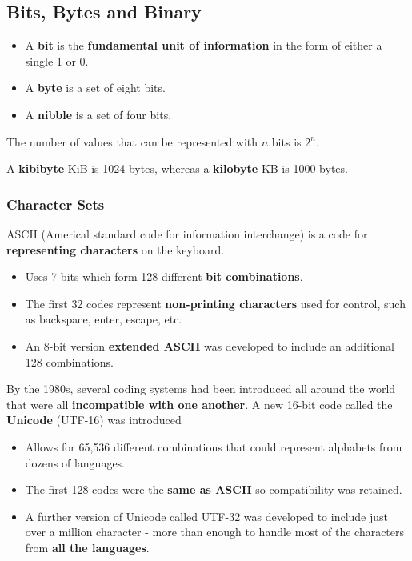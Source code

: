 \subsection{Bits, Bytes and Binary}
\begin{itemize}
    \item A \textbf{bit} is the \textbf{fundamental unit of information} in the form of either a single 1 or 0.
    \item A \textbf{byte} is a set of eight bits.
    \item A \textbf{nibble} is a set of four bits.
\end{itemize}

The number of values that can be represented with $n$ bits is $2^n$.

A \textbf{kibibyte} KiB is 1024 bytes, whereas a \textbf{kilobyte} KB is 1000 bytes.

\subsubsection*{Character Sets}

ASCII (Americal standard code for information interchange) is a code for \textbf{representing characters} on the keyboard.
\begin{itemize}
    \item Uses 7 bits which form 128 different \textbf{bit combinations}.
    \item The first 32 codes represent \textbf{non-printing characters} used for control, such as backspace, enter, escape, etc.
    \item An 8-bit version \textbf{extended ASCII} was developed to include an additional 128 combinations.
\end{itemize}

By the 1980s, several coding systems had been introduced all around the world that were all \textbf{incompatible with one another}. A new 16-bit code called the \textbf{Unicode} (UTF-16) was introduced
\begin{itemize}
    \item Allows for 65,536 different combinations that could represent alphabets from dozens of languages.
    \item The first 128 codes were the \textbf{same as ASCII} so compatibility was retained.
    \item A further version of Unicode called UTF-32 was developed to include just over a million character - more than enough to handle most of the characters from \textbf{all the languages}.
\end{itemize}


